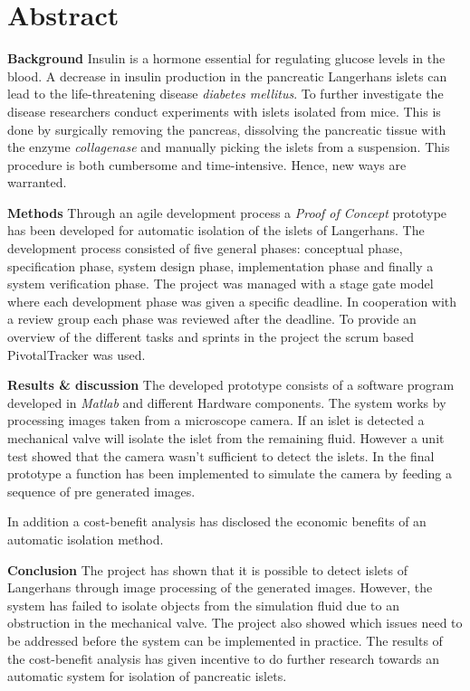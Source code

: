 \section*{Abstract}
\textbf{Background}
Insulin is a hormone essential for regulating glucose levels in the blood. A decrease in insulin production in the pancreatic Langerhans islets can lead to the life-threatening disease \textit{diabetes mellitus}. To further investigate the disease researchers conduct experiments with islets isolated from mice. This is done by surgically removing the pancreas, dissolving the pancreatic tissue with the enzyme \textit{collagenase} and manually picking the islets from a suspension. This procedure is both cumbersome and time-intensive. Hence, new ways are warranted.   

\textbf{Methods}
Through an agile development process a \textit{Proof of Concept} prototype has been developed for automatic isolation of the islets of Langerhans. The development process consisted of five general phases: conceptual phase,  specification phase, system design phase, implementation phase and finally a system verification phase. The project was managed with a stage gate model where each development phase was given a specific deadline. In cooperation with a review group each phase was reviewed after the deadline. To provide an overview of the different tasks and sprints in the project the scrum based PivotalTracker was used.   


\textbf{Results \& discussion} The developed prototype consists of a software program developed in \textit{Matlab} and different Hardware components.  The system works by processing images taken from a microscope camera. If an islet is detected a mechanical valve will isolate the islet from the remaining fluid. However a unit test showed that the camera wasn't sufficient to detect the islets. In the final prototype a function has been implemented to simulate the camera by feeding a sequence of pre generated images.

In addition a cost-benefit analysis has disclosed the economic benefits of an automatic isolation method.

\textbf{Conclusion}
The project has shown that it is possible to detect islets of Langerhans through image processing of the generated images. However, the system has failed to isolate objects from the simulation fluid due to an obstruction in the mechanical valve. The project also showed which issues need to be addressed before the system can be implemented in practice. The results of the cost-benefit analysis has given incentive to do further research towards an automatic system for isolation of pancreatic islets. 